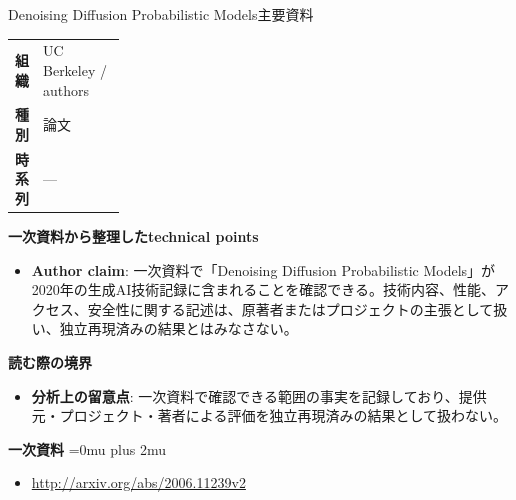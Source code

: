 \begin{technicalnote}{Denoising Diffusion Probabilistic Models}{主要資料}
\begingroup
\begin{tabularx}{\linewidth}{@{}>{\bfseries}p{0.22\linewidth}X@{}}
組織 & UC Berkeley / authors \\
種別 & 論文 \\
時系列 & — \\
\end{tabularx}
\smallskip
{\bfseries 一次資料から整理したtechnical points}
\begin{itemize}[leftmargin=1.5em,itemsep=0.35em]
\item \textbf{Author claim}: 一次資料で「Denoising Diffusion Probabilistic Models」が2020年の生成AI技術記録に含まれることを確認できる。技術内容、性能、アクセス、安全性に関する記述は、原著者またはプロジェクトの主張として扱い、独立再現済みの結果とはみなさない。
\end{itemize}
\begin{minipage}{\linewidth}
{\bfseries 読む際の境界}
\begin{itemize}[leftmargin=1.5em,itemsep=0.35em]
\item \textbf{分析上の留意点}: 一次資料で確認できる範囲の事実を記録しており、提供元・プロジェクト・著者による評価を独立再現済みの結果として扱わない。
\end{itemize}
\begin{samepage}
{\bfseries 一次資料}
\begingroup\sloppy
\Urlmuskip=0mu plus 2mu\relax
\begin{itemize}[leftmargin=1.5em,itemsep=0.25em]
\item {\scriptsize\url{http://arxiv.org/abs/2006.11239v2}}
\end{itemize}
\endgroup
\end{samepage}
\end{minipage}
\endgroup
\end{technicalnote}
\medskip

